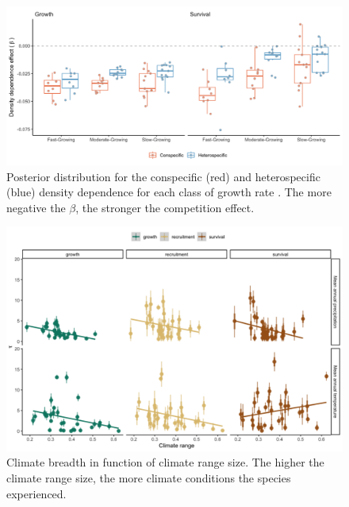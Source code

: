 \newpage

\hypertarget{fig:figsupp9_ch2}{%
\begin{figure}
\centering
\includegraphics{manuscript/figs/comp_CNDD_vs_growth.png}
\caption[{Posterior distribution for the conspecific (red) and
heterospecific (blue) density dependence for each class of growth rate
\citep{burns1990silvics}.}]{Posterior distribution for the conspecific
(red) and heterospecific (blue) density dependence for each class of
growth rate \citep{burns1990silvics}. The more negative the \(\beta\),
the stronger the competition effect.}
\label{fig:figsupp9_ch2}
\end{figure}
}

\newpage

\hypertarget{fig:figsupp10_ch2}{%
\begin{figure}
\centering
\includegraphics{manuscript/figs/fig-climRangeVsTau-1.png}
\caption[{Climate breadth in function of climate range size.}]{Climate
breadth in function of climate range size. The higher the climate range
size, the more climate conditions the species experienced.}
\label{fig:figsupp10_ch2}
\end{figure}
}

